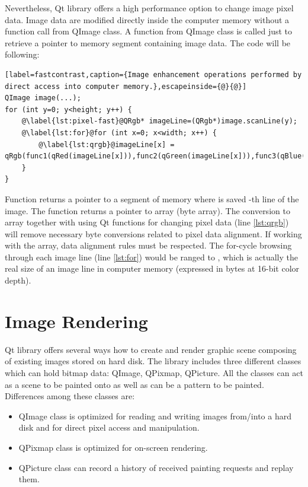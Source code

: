 Nevertheless, Qt library offers a high performance option to change image pixel data. Image data are modified directly inside the computer memory without a function call from QImage class. A function from QImage class is called just to retrieve a pointer to memory segment containing image data. The code will be following:

\begin{lstlisting}[label=fastcontrast,caption={Image enhancement operations performed by direct access into computer memory.},escapeinside={@}{@}]
QImage image(...);
for (int y=0; y<height; y++) {
	@\label{lst:pixel-fast}@QRgb* imageLine=(QRgb*)image.scanLine(y);
	@\label{lst:for}@for (int x=0; x<width; x++) {
		@\label{lst:qrgb}@imageLine[x] = qRgb(func1(qRed(imageLine[x])),func2(qGreen(imageLine[x])),func3(qBlue(imageLine[x])));
	}
}
\end{lstlisting}

Function  returns a pointer to a segment of memory where is saved -th line of the image. The  function returns a pointer to  array (byte array). The conversion to  array together with using Qt functions for changing pixel data (line \ref{lst:qrgb}) will remove necessary byte conversions related to pixel data alignment. If working with the  array, data alignment rules must be respected. The for-cycle browsing through each image line (line \ref{lst:for}) would be ranged to , which is actually the real size of an image line in computer memory (expressed in bytes at 16-bit color depth).


\section{Image Rendering}
\label{rendering}
Qt library offers several ways how to create and render graphic scene composing of existing images stored on hard disk. The library includes three different classes which can hold bitmap data: QImage, QPixmap, QPicture. All the classes can act as a scene to be painted onto as well as can be a pattern to be painted. Differences among these classes are\cite{QtDoc}:

\begin{itemize}
\item QImage class is optimized for reading and writing images from/into a hard disk and for direct pixel access and manipulation.
\item QPixmap class is optimized for on-screen rendering.
\item QPicture class can record a history of received painting requests and replay them.
\end{itemize}

